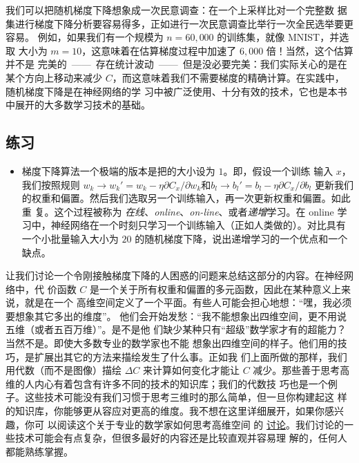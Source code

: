 我们可以把随机梯度下降想象成一次民意调查：在一个\minibatch{}上采样比对一个完整数
据集进行梯度下降分析要容易得多，正如进行一次民意调查比举行一次全民选举要更容易。
例如，如果我们有一个规模为 $n = 60,000$ 的训练集，就像 MNIST，并选取\minibatch{}
大小为 $m = 10$，这意味着在估算梯度过程中加速了 $6,000$ 倍！当然，这个估算并不是
完美的~——~存在统计波动~——~但是没必要完美：我们实际关心的是在某个方向上移动来减少
$C$，而这意味着我们不需要梯度的精确计算。在实践中，随机梯度下降是在神经网络的学
习中被广泛使用、十分有效的技术，它也是本书中展开的大多数学习技术的基础。

\subsection*{练习}

\begin{itemize}
\item 梯度下降算法一个极端的版本是把\minibatch{}的大小设为 $1$。即，假设一个训练
  输入 $x$，我们按照规则 $w_k \rightarrow w_k' = w_k - \eta \partial C_x /
  \partial w_k$和$b_l \rightarrow b_l' = b_l - \eta \partial C_x / \partial b_l$
  更新我们的权重和偏置。然后我们选取另一个训练输入，再一次更新权重和偏置。如此重
  复。这个过程被称为 \emph{在线}、\emph{online}、\emph{on-line}、或者\emph{递增}学习。在
  online 学习中，神经网络在一个时刻只学习一个训练输入（正如人类做的）。对比具有
  一个小批量输入大小为 $20$ 的随机梯度下降，说出递增学习的一个优点和一个缺点。
\end{itemize}

让我们讨论一个令刚接触梯度下降的人困惑的问题来总结这部分的内容。在神经网络中，代
价函数 $C$ 是一个关于所有权重和偏置的多元函数，因此在某种意义上来说，就是在一个
高维空间定义了一个平面。有些人可能会担心地想：“嘿，我必须要想象其它多出的维度”。
他们会开始发愁：“我不能想象出四维空间，更不用说五维（或者五百万维）”。是不是他
们缺少某种只有“超级”数学家才有的超能力？当然不是。即使大多数专业的数学家也不能
想象出四维空间的样子。他们用的技巧，是扩展出其它的方法来描绘发生了什么事。正如我
们上面所做的那样，我们用代数（而不是图像）描绘 $\Delta C$ 来计算如何变化才能让
$C$ 减少。那些善于思考高维的人内心有着包含有许多不同的技术的知识库；我们的代数技
巧也是一个例子。这些技术可能没有我们习惯于思考三维时的那么简单，但一旦你构建起这
样的知识库，你能够更从容应对更高的维度。我不想在这里详细展开，如果你感兴趣，你可
以阅读这个关于专业的数学家如何思考高维空间
的%
\href{http://mathoverflow.net/questions/25983/intuitive-crutches-for-higher-dimensional-thinking}{
  讨论}。我们讨论的一些技术可能会有点复杂，但很多最好的内容还是比较直观并容易理
解的，任何人都能熟练掌握。

